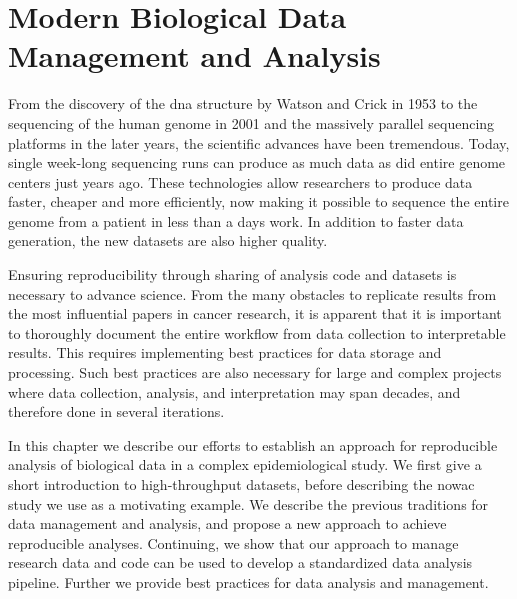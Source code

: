 \chapter{Modern Biological Data Management and Analysis}\label{biodata}
From the discovery of the \gls{dna} structure by Watson and Crick in
1953\cite{watson1953molecular} to the sequencing of the human genome in 2001
\cite{venter2001sequence,international2001initial} and the massively parallel
sequencing platforms in the later years\cite{metzker2010sequencing}, the
scientific advances have been tremendous. Today, single week-long sequencing
runs can produce as much data as did entire genome centers just years
ago.\cite{kahn2011future}  These technologies allow researchers to produce data
faster, cheaper and more efficiently, now making it possible to sequence the
entire genome from a patient in less than a days work. In addition to faster
data generation, the new datasets are also higher quality.

Ensuring reproducibility through sharing of analysis code and datasets is
necessary to advance science.\cite{baker2016scientists} From the many obstacles
to replicate results from the most influential papers in cancer
research\cite{reprod}, it is apparent that it is important to thoroughly
document the entire workflow from data collection to interpretable results.
This requires implementing best practices for data storage and processing. Such
best practices are also necessary for large and complex projects where data
collection, analysis, and interpretation may span decades, and therefore done
in several iterations. 

In this chapter we describe our efforts to establish an approach for
reproducible analysis of biological data in a complex epidemiological study. We
first give a short introduction to high-throughput datasets, before describing
the \gls{nowac} study we use as a motivating example. We describe the previous
traditions for data management and analysis, and propose a new approach to
achieve reproducible analyses. Continuing, we show that our approach to manage
research data and code can be used to develop a standardized data analysis
pipeline. Further we provide best practices for data analysis and management. 


